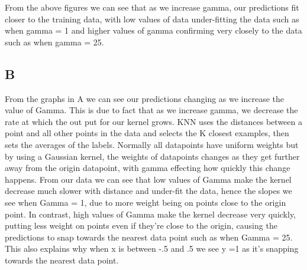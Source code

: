 \documentclass[11pt]{article} %
\begin{document}
\begin{figure}[h]
\qquad
{}
\end{figure}
From the above figures we can see that as we increase gamma, our predictions fit closer to the training data,  with low values of data under-fitting the data such as when gamma = 1 and higher values of gamma confirming very closely to the data such as when gamma = 25.

\subsection{B}
From the graphs in A we can see our predictions changing as we increase the value of Gamma. This is due to fact that as we increase gamma, we decrease the rate at which the out put for our kernel grows. KNN uses the distances between a point and all other points in the data and selects the K closest examples, then sets the averages of the labels. Normally all datapoints have uniform weights but by using a Gaussian kernel, the weights of datapoints changes as they get further away from the origin datapoint, with gamma effecting how quickly this change happens. From our data we can see that low values of Gamma make the kernel decrease much slower with distance and under-fit the data, hence the slopes we see when Gamma = 1, due to more weight being on points close to the origin point. In contrast, high values of Gamma make the kernel decrease very quickly, putting less weight on points even if they're close to the origin, causing the predictions to snap towards the nearest data point such as when Gamma = 25. This also explains why when x is between -.5 and .5 we see y =1 as it's snapping towards the nearest data point. 
\end{document}
